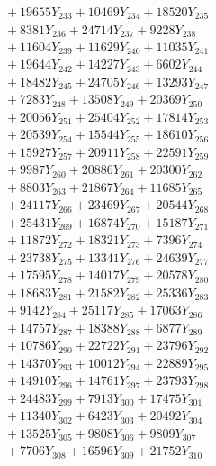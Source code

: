 \documentclass[a4paper,10pt]{article}
\begin{document}
{\begin{align}
&\;  + 19655 Y_{233} + 10469 Y_{234} + 18520 Y_{235} \\[0.3ex]
&\;  + 8381 Y_{236} + 24714 Y_{237} + 9228 Y_{238} \\[0.5ex]\allowbreak
&\;  + 11604 Y_{239} + 11629 Y_{240} + 11035 Y_{241} \\[0.3ex]
&\;  + 19644 Y_{242} + 14227 Y_{243} + 6602 Y_{244} \\[0.3ex]
&\;  + 18482 Y_{245} + 24705 Y_{246} + 13293 Y_{247} \\[0.3ex]
&\;  + 7283 Y_{248} + 13508 Y_{249} + 20369 Y_{250} \\[0.3ex]
&\;  + 20056 Y_{251} + 25404 Y_{252} + 17814 Y_{253} \\[0.3ex]
&\;  + 20539 Y_{254} + 15544 Y_{255} + 18610 Y_{256} \\[0.3ex]
&\;  + 15927 Y_{257} + 20911 Y_{258} + 22591 Y_{259} \\[0.3ex]
&\;  + 9987 Y_{260} + 20886 Y_{261} + 20300 Y_{262} \\[0.3ex]
&\;  + 8803 Y_{263} + 21867 Y_{264} + 11685 Y_{265} \\[0.3ex]
&\;  + 24117 Y_{266} + 23469 Y_{267} + 20544 Y_{268} \\[0.5ex]\allowbreak
&\;  + 25431 Y_{269} + 16874 Y_{270} + 15187 Y_{271} \\[0.3ex]
&\;  + 11872 Y_{272} + 18321 Y_{273} + 7396 Y_{274} \\[0.3ex]
&\;  + 23738 Y_{275} + 13341 Y_{276} + 24639 Y_{277} \\[0.3ex]
&\;  + 17595 Y_{278} + 14017 Y_{279} + 20578 Y_{280} \\[0.3ex]
&\;  + 18683 Y_{281} + 21582 Y_{282} + 25336 Y_{283} \\[0.3ex]
&\;  + 9142 Y_{284} + 25117 Y_{285} + 17063 Y_{286} \\[0.3ex]
&\;  + 14757 Y_{287} + 18388 Y_{288} + 6877 Y_{289} \\[0.3ex]
&\;  + 10786 Y_{290} + 22722 Y_{291} + 23796 Y_{292} \\[0.3ex]
&\;  + 14370 Y_{293} + 10012 Y_{294} + 22889 Y_{295} \\[0.3ex]
&\;  + 14910 Y_{296} + 14761 Y_{297} + 23793 Y_{298} \\[0.5ex]\allowbreak
&\;  + 24483 Y_{299} + 7913 Y_{300} + 17475 Y_{301} \\[0.3ex]
&\;  + 11340 Y_{302} + 6423 Y_{303} + 20492 Y_{304} \\[0.3ex]
&\;  + 13525 Y_{305} + 9808 Y_{306} + 9809 Y_{307} \\[0.3ex]
&\;  + 7706 Y_{308} + 16596 Y_{309} + 21752 Y_{310} \\[0.3ex]

\end{align}}
\end{document}
